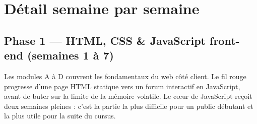 \documentclass[a4paper,11pt]{article}
\begin{document}
\newpage

\section{Détail semaine par semaine}

\subsection{Phase 1 --- HTML, CSS \& JavaScript front-end (semaines 1 à 7)}

\begin{tcolorbox}[intro]
\small Les modules A à D couvrent les fondamentaux du web côté client. Le fil rouge progresse d'une page HTML statique vers un forum interactif en JavaScript, avant de buter sur la limite de la mémoire volatile. Le cœur de JavaScript reçoit deux semaines pleines : c'est la partie la plus difficile pour un public débutant et la plus utile pour la suite du cursus.
\end{tcolorbox}
\end{document}
